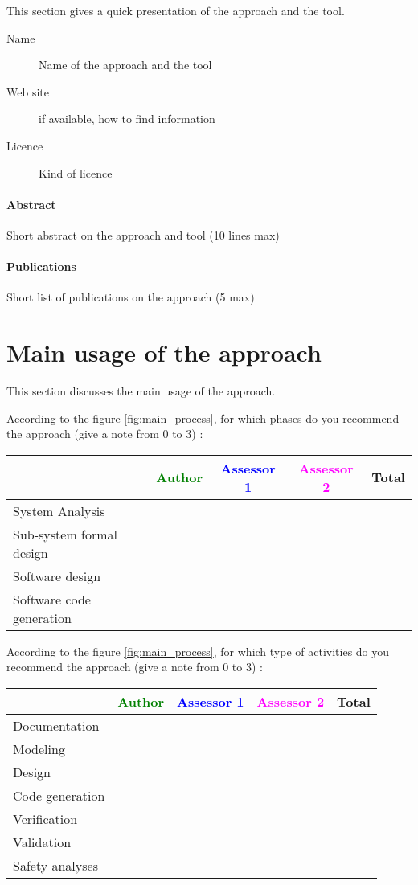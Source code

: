 This section gives a quick presentation of the approach and the tool.

\begin{description}
\item[Name] Name of the approach and the tool
\item[Web site] if available, how to  find information
\item[Licence] Kind of licence
\end{description}

\paragraph{Abstract} Short abstract on the approach and tool (10 lines max)

\paragraph{Publications} Short list of publications on the approach (5 max)


\section{Main usage of the approach}
\label{main_usage}
This section discusses the main usage of the approach.

According to the figure \ref{fig:main_process}, for which phases do you recommend the approach (give a note from 0 to  3) :

\begin{tabular}{|l | c | c | c | c|}
\hline
& \textcolor{green}{Author} & \textcolor{blue}{Assessor 1} & \textcolor{magenta}{Assessor 2} & Total \\
\hline 
System Analysis & & & &  \\
\hline
Sub-system formal design & & & & \\
\hline
Software design & & & & \\
\hline
Software code generation & & & & \\
\hline
\end{tabular}

According to the figure \ref{fig:main_process}, for which type of activities do you recommend the approach (give a note from 0 to  3) :

\begin{tabular}{|l | c | c | c | c|}
\hline
& \textcolor{green}{Author} & \textcolor{blue}{Assessor 1} & \textcolor{magenta}{Assessor 2} & Total \\
\hline 
Documentation & & & &  \\
\hline
Modeling & & & &  \\
\hline
Design & & & & \\
\hline
Code generation & & & & \\
\hline
Verification & & & & \\
\hline
Validation & & & & \\
\hline
Safety analyses & & & & \\
\hline
\end{tabular}

